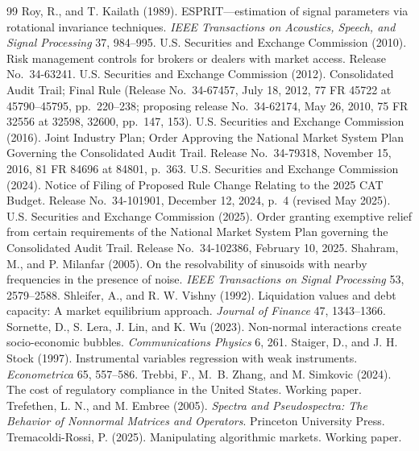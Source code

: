 \documentclass[12pt]{article}
\theoremstyle{definition}
\theoremstyle{remark}
\begin{document}
\begin{thebibliography}{99}
 Roy, R., and T. Kailath (1989). ESPRIT---estimation of signal parameters via rotational invariance techniques. \emph{IEEE Transactions on Acoustics, Speech, and Signal Processing} 37, 984--995.
 U.S. Securities and Exchange Commission (2010). Risk management controls for brokers or dealers with market access. Release No.\ 34-63241.
 U.S. Securities and Exchange Commission (2012). Consolidated Audit Trail; Final Rule (Release No.\ 34-67457, July 18, 2012, 77 FR 45722 at 45790--45795, pp.\ 220--238; proposing release No.\ 34-62174, May 26, 2010, 75 FR 32556 at 32598, 32600, pp.\ 147, 153).
 U.S. Securities and Exchange Commission (2016). Joint Industry Plan; Order Approving the National Market System Plan Governing the Consolidated Audit Trail. Release No.\ 34-79318, November 15, 2016, 81 FR 84696 at 84801, p.\ 363.
 U.S. Securities and Exchange Commission (2024). Notice of Filing of Proposed Rule Change Relating to the 2025 CAT Budget. Release No.\ 34-101901, December 12, 2024, p.\ 4 (revised May 2025).
 U.S. Securities and Exchange Commission (2025). Order granting exemptive relief from certain requirements of the National Market System Plan governing the Consolidated Audit Trail. Release No.\ 34-102386, February 10, 2025.
 Shahram, M., and P. Milanfar (2005). On the resolvability of sinusoids with nearby frequencies in the presence of noise. \emph{IEEE Transactions on Signal Processing} 53, 2579--2588.
 Shleifer, A., and R. W. Vishny (1992). Liquidation values and debt capacity: A market equilibrium approach. \emph{Journal of Finance} 47, 1343--1366.
 Sornette, D., S. Lera, J. Lin, and K. Wu (2023). Non-normal interactions create socio-economic bubbles. \emph{Communications Physics} 6, 261.
 Staiger, D., and J. H. Stock (1997). Instrumental variables regression with weak instruments. \emph{Econometrica} 65, 557--586.
 Trebbi, F., M.~B. Zhang, and M. Simkovic (2024). The cost of regulatory compliance in the United States. Working paper.
 Trefethen, L. N., and M. Embree (2005). \emph{Spectra and Pseudospectra: The Behavior of Nonnormal Matrices and Operators}. Princeton University Press.
 Tremacoldi-Rossi, P. (2025). Manipulating algorithmic markets. Working paper.

\end{thebibliography}
\end{document}
